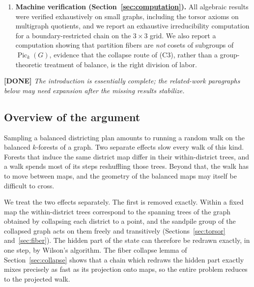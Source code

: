 \documentclass[11pt]{article}
\newcommand{\done}[1]{\medskip\noindent\textcolor{donecol}{\textbf{[DONE]} \emph{#1}}\medskip}
\newcommand{\Pick}[1]{\operatorname{Pic}_k(#1)}
\begin{document}
\begin{enumerate}[(C1)]
    chain mixes in $O(k \log k)$ steps
    (Corollary~\ref{cor:strip-mixing}). The collapse lemma reduces the
    problem to a heat-bath interface chain, which a concentration-driven
    coupling mixes in two sweeps.
    Irreducibility on rectangles (Conjecture~\ref{conj:irred}) and mixing
    on two-dimensional grids remain open.
  \item \textbf{Machine verification (Section~\ref{sec:computation}).} All
    algebraic results were verified exhaustively on small graphs, including
    the torsor axioms on multigraph quotients, and we report an exhaustive
    irreducibility computation for a boundary-restricted chain on the
    $3 \times 3$ grid. We also report a computation showing that partition
    fibers are \emph{not} cosets of subgroups of $\Pick{G}$, evidence that
    the collapse route of (C3), rather than a group-theoretic treatment of
    balance, is the right division of labor.
\end{enumerate}

\done{The introduction is essentially complete; the related-work paragraphs
below may need expansion after the missing results stabilize.}

\subsection{Overview of the argument}
\label{subsec:story}

Sampling a balanced districting plan amounts to running a random walk
on the balanced $k$-forests of a graph. Two separate effects slow every
walk of this kind. Forests that induce the same district map differ in
their within-district trees, and a walk spends most of its steps
reshuffling those trees. Beyond that, the walk has to move between maps,
and the geometry of the balanced maps may itself be difficult to cross.

We treat the two effects separately. The first is removed exactly.
Within a fixed map the within-district trees correspond to the spanning
trees of the graph obtained by collapsing each district to a point, and
the sandpile group of the collapsed graph acts on them freely and
transitively (Sections~\ref{sec:torsor} and~\ref{sec:fiber}). The
hidden part of the state can therefore be redrawn exactly, in one step,
by Wilson's algorithm. The fiber collapse lemma of
Section~\ref{sec:collapse} shows that a chain which redraws the hidden
part exactly mixes precisely as fast as its projection onto maps, so
the entire problem reduces to the projected walk.
\end{document}
